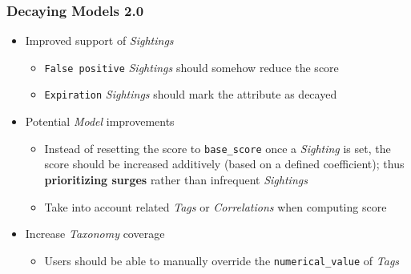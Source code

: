 \begin{frame}
    \frametitle{Decaying Models 2.0}
    \begin{itemize}
        \item Improved support of \textit{Sightings}
        \begin{itemize}
            \item \texttt{False positive} \textit{Sightings} should somehow reduce the score
            \item \texttt{Expiration} \textit{Sightings} should mark the attribute as decayed
        \end{itemize}
        \item Potential \textit{Model} improvements
        \begin{itemize}
            \item Instead of resetting the score to \texttt{base\_score} once a \textit{Sighting} is set, the score should be increased additively (based on a defined coefficient); thus \textbf{prioritizing surges} rather than infrequent \textit{Sightings}
            \item Take into account related \textit{Tags} or \textit{Correlations} when computing score
        \end{itemize}
        \item Increase \textit{Taxonomy} coverage
        \begin{itemize}
            \item Users should be able to manually override the \texttt{numerical\_value} of \textit{Tags}
        \end{itemize}
    \end{itemize}
\end{frame}
